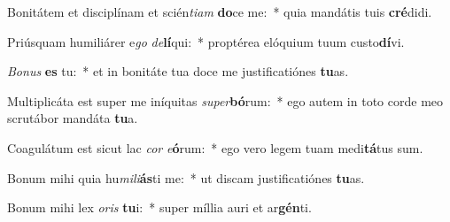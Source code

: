 \item Bonitátem et disciplínam et scién\textit{ti}\textit{am} \textbf{do}ce me:~* quia mandátis tuis \textbf{cré}didi.
\item Priúsquam humiliárer e\textit{go} \textit{de}\textbf{lí}qui:~* proptérea elóquium tuum custo\textbf{dí}vi.
\item \textit{Bo}\textit{nus} \textbf{es} tu:~* et in bonitáte tua doce me justificatiónes \textbf{tu}as.
\item Multiplicáta est super me iníquitas \textit{su}\textit{per}\textbf{bó}rum:~* ego autem in toto corde meo scrutábor mandáta \textbf{tu}a.
\item Coagulátum est sicut lac \textit{cor} \textit{e}\textbf{ó}rum:~* ego vero legem tuam medi\textbf{tá}tus sum.
\item Bonum mihi quia hu\textit{mi}\textit{li}\textbf{ás}ti me:~* ut discam justificatiónes \textbf{tu}as.
\item Bonum mihi lex \textit{o}\textit{ris} \textbf{tu}i:~* super míllia auri et ar\textbf{gén}ti.
